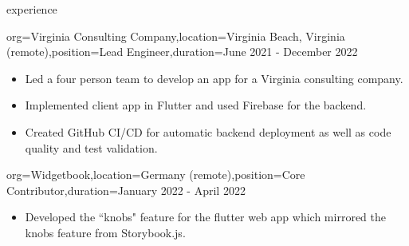 \documentclass{resume}
\begin{document}
\begin{ResumeSection}{experience}
    \begin{ResumeSubsection}{org={Virginia Consulting
        Company},location={Virginia Beach, Virginia (remote)},position={Lead
    Engineer},duration={June 2021 - December 2022}}
        \begin{itemize}
            \item {Led a four person team to develop an app for a Virginia consulting company.}
            \item {Implemented client app in Flutter and used Firebase for the backend.}
            \item {Created GitHub CI/CD for automatic backend deployment as well as code quality and test validation.}
        \end{itemize}
    \end{ResumeSubsection}

    \begin{ResumeSubsection}{org={Widgetbook},location={Germany
        (remote)},position={Core Contributor},duration={January 2022 - April 2022}}
        \begin{itemize}
            \item Developed the ``knobs" feature for the flutter web app which mirrored the knobs feature from
                Storybook.js.
        \end{itemize}
    \end{ResumeSubsection}


\end{ResumeSection}
\end{document}
